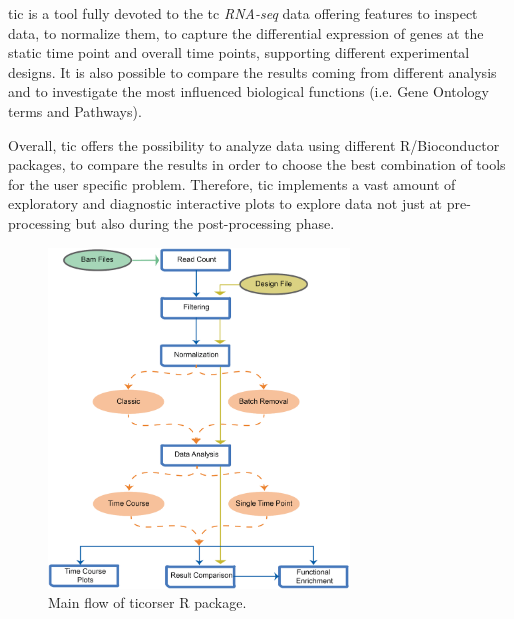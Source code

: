 \gls{tic} is a tool fully devoted to the \gls{tc} \textit{RNA-seq} data offering features to inspect data, to normalize them, to capture the differential expression of genes at the static time point and overall time points, supporting different experimental designs.
It is also possible to compare the results coming from different analysis and to investigate the most influenced biological functions (i.e. Gene Ontology \cite{GeneOntologyConsortium2004, GeneOntologyConsortium2015} terms and Pathways).

Overall, \gls{tic} offers the possibility to analyze data using different R/Bioconductor \cite{Gentleman2004} packages, to compare the results in order to choose the best combination of tools for the user specific problem. Therefore, \gls{tic} implements a vast amount of exploratory and diagnostic interactive plots to explore data not just at pre-processing but also during the post-processing phase. 


\begin{figure}[h]
\centering
\includegraphics[width=8cm, keepaspectratio]{img/ticorser/main_flow.pdf}
\caption[ticorser mainflow]{Main flow of ticorser R package.}
\label{fig:ticorserflow}
\end{figure}

